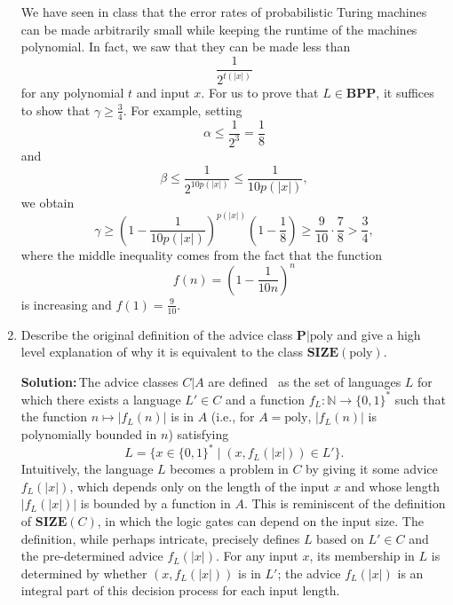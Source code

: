 \documentclass{amsart}
\theoremstyle{plain}
\theoremstyle{definition}
\newcommand{\N}{\mathbb{N}}
\newcommand{\size}[1]{\textbf{SIZE}(#1)}
\newcommand{\poly}{\text{poly}}
\newcommand{\advice}[2]{#1 | #2}
\newcommand{\bpp}{\textbf{BPP}}
\newcommand{\p}{\textbf{P}}
\newcommand{\sol}{\textbf{Solution:\,}}
\begin{document}
\begin{enumerate}[label=\textbf{Exercise \arabic*:}, leftmargin=0cm, labelwidth=-0.2cm, align=left]
            We have seen in class that the error rates of probabilistic Turing machines
            can be made arbitrarily small
            while keeping the runtime of the machines polynomial.
            In fact, we saw that they can be made less than
            \[
                \frac{1}{2^{t(|x|)}}
            \]
            for any polynomial $t$ and input $x$.
            For us to prove that $L \in \bpp$, it suffices to show that $\gamma \geq \frac{3}{4}$.
            For example, setting
            \[
                \alpha \leq \frac{1}{2^3} = \frac{1}{8}
            \]
            and
            \[
                \beta \leq \frac{1}{2^{10 p(|x|)}} \leq \frac{1}{10 p(|x|)},
            \]
            we obtain
            \[
                \gamma
                \geq \left(1 - \frac{1}{10 p(|x|)}\right)^{p(|x|)} \left( 1 - \frac{1}{8} \right)
                \geq \frac{9}{10} \cdot \frac{7}{8}
                > \frac{3}{4},
            \]
            where the middle inequality comes from the fact that the function
            \[
                f(n) = \left(1 - \frac{1}{10 n}\right)^{n}
            \]
            is increasing and $f(1) = \frac{9}{10}$.

        \newpage \item Describe the original definition of the advice class $\advice{\p}{\poly}$
        and give a high level explanation of why it is equivalent to the class $\size{\poly}$.

        \sol The advice classes $\advice{C}{A}$ are defined~\cite{karp1982turing} as the set of languages $L$
        for which there exists a language $L' \in C$ and a
        function $f_L: \N \to \{0, 1\}^*$ such that the function
        $n \mapsto |f_L(n)|$ is in $A$ (i.e., for $A=\poly$, $|f_L(n)|$ is polynomially bounded in $n$)
        satisfying
        \[
            L = \{x \in \{0, 1\}^* \mid (x, f_L(|x|)) \in L'\}.
        \]
        Intuitively, the language $L$ becomes a problem in $C$ by
        giving it some advice $f_L(|x|)$, which depends only on the length of the input $x$ and whose length $|f_L(|x|)|$ is bounded by a function in $A$.
        This is reminiscent of the definition of $\size{C}$, in which the logic gates can depend on the input size.
        The definition, while perhaps intricate, precisely defines $L$ based on $L' \in C$ and the pre-determined advice $f_L(|x|)$.
        For any input $x$, its membership in $L$ is determined by whether
        $(x, f_L(|x|))$ is in $L'$; the advice $f_L(|x|)$ is an integral part of this decision process for each input length.


\end{enumerate}
\end{document}
